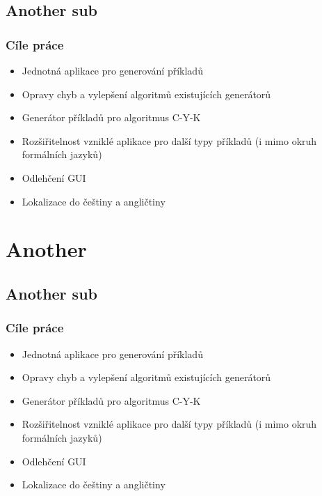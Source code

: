 \documentclass[pdf,compress]{beamer}
\begin{document}
\subsection[]{Another sub}
\begin{frame}
\frametitle{Cíle práce}
\begin{itemize}
\item Jednotná aplikace pro generování příkladů
\item Opravy chyb a vylepšení algoritmů existujících generátorů \pause
\item Generátor příkladů pro algoritmus C-Y-K \pause
\item Rozšiřitelnost vzniklé aplikace pro další typy příkladů (i mimo okruh formálních jazyků) \pause
\item Odlehčení GUI \pause
\item Lokalizace do češtiny a angličtiny
\end{itemize}

\end{frame}

\section[Another]{Another}
\subsection[]{Another sub}
\begin{frame}
\frametitle{Cíle práce}
\begin{itemize}
\item Jednotná aplikace pro generování příkladů
\item Opravy chyb a vylepšení algoritmů existujících generátorů \pause
\item Generátor příkladů pro algoritmus C-Y-K \pause
\item Rozšiřitelnost vzniklé aplikace pro další typy příkladů (i mimo okruh formálních jazyků) \pause
\item Odlehčení GUI \pause
\item Lokalizace do češtiny a angličtiny
\end{itemize}
\end{frame}


\end{document}
